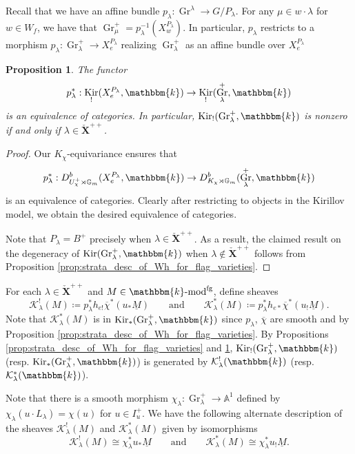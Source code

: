 \documentclass{amsart}
\newcommand{\A}{\mathbb{A}}
\newcommand{\G}{\mathbb{G}}
\renewcommand{\k}{\mathbbm{k}}
\newcommand{\scrK}{\mathcal{K}}
\newcommand{\bfXv}{\check{\mathbf{X}}}
\renewcommand{\mod}[1]{#1\textnormal{-mod}}
\DeclareMathOperator{\Gr}{Gr}
\DeclareMathOperator{\fg}{fg}
\DeclareMathOperator{\Kir}{Kir}
\newtheorem{proposition}[subsubsection]{Proposition}
\theoremstyle{definition}
\begin{document}
    Recall that we have an affine bundle $p_{\lambda} : \Gr^{\lambda} \to G/P_{\lambda}$.
    For any $\mu \in w \cdot \lambda$ for $w\in W_f$, we have that $\Gr_{\mu}^{+} = p_{\lambda}^{-1} (X_w^{P_{\lambda}})$.
    In particular, $p_{\lambda}$ restricts to a morphism $p_{\lambda} : \Gr_{\lambda}^{+} \to X_e^{P_{\lambda}}$ realizing $\Gr_{\lambda}^{+}$ as an affine bundle over $X_e^{P_{\lambda}}$ 

    \begin{proposition}\label{prop:reduction_to_flag_variety}
        The functor
        \[p_{\lambda}^* : \Kir_! (X_e^{P_{\lambda}}, \k) \to \Kir_! ( \Gr_{\lambda}^{+}, \k)\]
        is an equivalence of categories. In particular, $\Kir_! ( \Gr_{\lambda}^{+}, \k)$ is nonzero if and only if $\lambda \in \bfXv^{++}$.
    \end{proposition}
    \begin{proof}
        Our $K_{\chi}$-equivariance ensures that 
        \[ p_{\lambda}^* : D_{U_{\chi}^+ \rtimes \G_m}^b (X_e^{P_{\lambda}}, \k) \to D_{K_{\chi} \rtimes \G_m}^b (\Gr_{\lambda}^{+}, \k)\]
        is an equivalence of categories. Clearly after restricting to objects in the Kirillov model, we obtain the desired equivalence of categories.

        Note that $P_{\lambda} = B^{+}$ precisely when $\lambda \in \bfXv^{++}$. As a result, the claimed result on the degeneracy of $\Kir ( \Gr_{\lambda}^{+}, \k)$ when $\lambda \notin \bfXv^{++}$ follows from Proposition \ref{prop:strata_desc_of_Wh_for_flag_varieties}.
    \end{proof}

    For each $\lambda \in \bfXv^{++}$ and $M \in \mod{\k}^{\fg}$, define sheaves
    \[\scrK_{\lambda}^! (M) \coloneq p_{\lambda}^* h_{e!} \overline{\chi}^* (u_* \underline{M}) \qquad\text{and}\qquad \scrK_{\lambda}^* (M) \coloneq p_{\lambda}^* h_{e*} \overline{\chi}^* (u_! \underline{M}).\] 
    Note that $\scrK_{\lambda}^* (M)$ is in $\Kir_* (\Gr_{\lambda}^+, \k)$ since $p_{\lambda}$, $\overline{\chi}$ are smooth and by Proposition \ref{prop:strata_desc_of_Wh_for_flag_varieties}.
    By Propositions \ref{prop:strata_desc_of_Wh_for_flag_varieties} and \ref{prop:reduction_to_flag_variety}, $\Kir_! (\Gr_{\lambda}^{+}, \k)$ (resp. $\Kir_* (\Gr_{\lambda}^{+}, \k)$) is generated by $\scrK_{\lambda}^! (\k)$ (resp. $\scrK_{\lambda}^* (\k)$).
    
    Note that there is a smooth morphism $\chi_{\lambda} : \Gr_{\lambda}^+ \to \A^1$ defined by $\chi_{\lambda} (u \cdot L_{\lambda}) = \chi (u)$ for $u \in I_u^+$.
    We have the following alternate description of the sheaves $\scrK_{\lambda}^! (M)$ and $\scrK_{\lambda}^* (M)$ given by isomorphisms
    \begin{equation}\label{eq:alt_desc_of_FLK}
        \scrK_{\lambda}^! (M) \cong \chi_{\lambda}^* u_* \underline{M} \qquad\text{and}\qquad \scrK_{\lambda}^* (M) \cong \chi_{\lambda}^* u_! \underline{M}.
    \end{equation}
\end{document}

